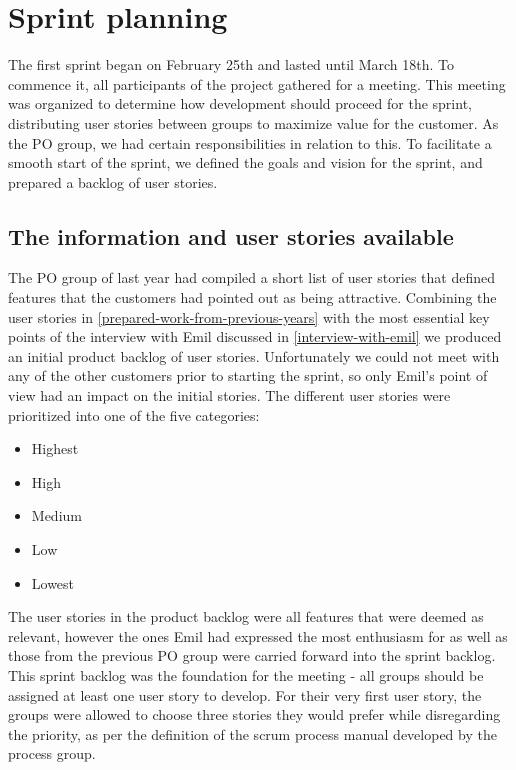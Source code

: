 \section{Sprint planning}\label{sprint-1-planning}
The first sprint began on February 25th and lasted until March 18th.
To commence it, all participants of the project gathered for a meeting.
This meeting was organized to determine how development should proceed for the sprint, distributing user stories between groups to maximize value for the customer.
As the PO group, we had certain responsibilities in relation to this.
To facilitate a smooth start of the sprint, we defined the goals and vision for the sprint, and prepared a backlog of user stories.

\subsection{The information and user stories available}
The PO group of last year had compiled a short list of user stories that defined features that the customers had pointed out as being attractive.
Combining the user stories in \autoref{prepared-work-from-previous-years} with the most essential key points of the interview with Emil discussed in \autoref{interview-with-emil} we produced an initial product backlog of user stories.
Unfortunately we could not meet with any of the other customers prior to starting the sprint, so only Emil's point of view had an impact on the initial stories.
The different user stories were prioritized into one of the five categories:
\begin{itemize}
    \item Highest
    \item High
    \item Medium
    \item Low
    \item Lowest
\end{itemize}
\noindent
The user stories in the product backlog were all features that were deemed as relevant, however the ones Emil had expressed the most enthusiasm for as well as those from the previous PO group were carried forward into the sprint backlog.
This sprint backlog was the foundation for the meeting - all groups should be assigned at least one user story to develop.
For their very first user story, the groups were allowed to choose three stories they would prefer while disregarding the priority, as per the definition of the scrum process manual developed by the process group.

